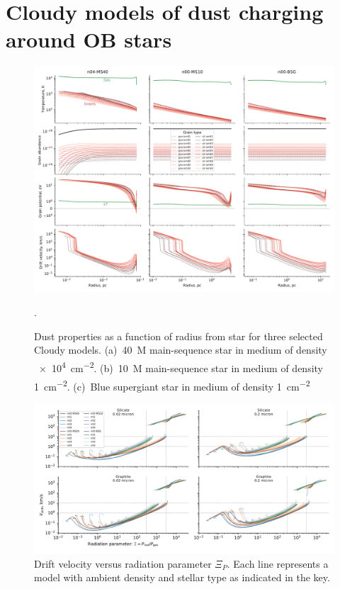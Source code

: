 
\section{Cloudy models of dust charging around OB stars}
\label{sec:cloudy-models-dust}

\begin{figure}
  \includegraphics[width=\linewidth]{figs/multi-dustprops}
  \caption{Dust properties as a function of radius from star for three
    selected Cloudy models. (a)~\SI{40}{M_\odot} main-sequence star in
    medium of density \SI{e4}{cm^{-2}}. (b)~\SI{10}{M_\odot} main-sequence
    star in medium of density \SI{1}{cm^{-2}}. (c)~Blue supergiant
    star in medium of density \SI{1}{cm^{-2}}}.
  \label{fig:multi-dustprops}
\end{figure}

\begin{figure}
  \includegraphics[width=\linewidth]{figs/drift-pratio-4panel}
  \caption{Drift velocity versus radiation parameter \(\Xi_P\). Each line
    represents a model with ambient density and stellar type as
    indicated in the key.}
  \label{fig:drift-gn}
\end{figure}

